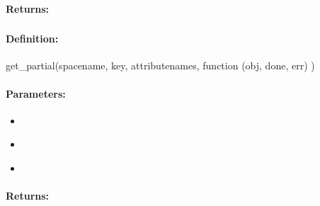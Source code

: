 \paragraph{Returns:}


\pagebreak
\subsubsection{}
\label{api:nodejs:get_partial}


\paragraph{Definition:}
\begin{javascriptcode}
get_partial(spacename, key, attributenames, function (obj, done, err) {})
\end{javascriptcode}
\paragraph{Parameters:}
\begin{itemize}[noitemsep]
\item {}\\

\item {}\\

\item {}\\

\end{itemize}

\paragraph{Returns:}


\pagebreak
\subsubsection{}
\label{api:nodejs:put}



